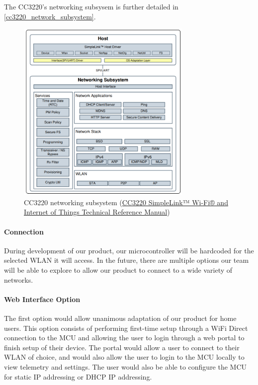 The CC3220's networking subsysem is further detailed in
\autoref{cc3220_network_subsystem}.
\begin{figure}[H]
    \caption{CC3220 networking subsystem (\href{https://www.ti.com/lit/ug/swru455m/swru455m.pdf}{CC3220 SimpleLink™ Wi-Fi® and Internet of Things Technical Reference Manual})}
    \label{cc3220_network_subsystem}
    \centering
    \includegraphics[width=0.75\textwidth]{images/cc3220_network_subsystem.png}
\end{figure}
\paragraph{Connection}
During development of our product, our microcontroller will be hardcoded
for the selected WLAN it will access. In the future, there are multiple
options our team will be able to explore to allow our product to connect to
a wide variety of networks. 

\paragraph{Web Interface Option}
The first option would allow unanimous adaptation of
our product for home users. This option consists of performing first-time
setup through a WiFi Direct connection to the MCU and allowing the user
to login through a web portal to finish setup of their device. The portal
would allow a user to connect to their WLAN of choice, and would
also allow the user to login to the MCU locally to view telemetry and 
settings. The user would also be able to configure the MCU for static
IP addressing or DHCP IP addressing.

